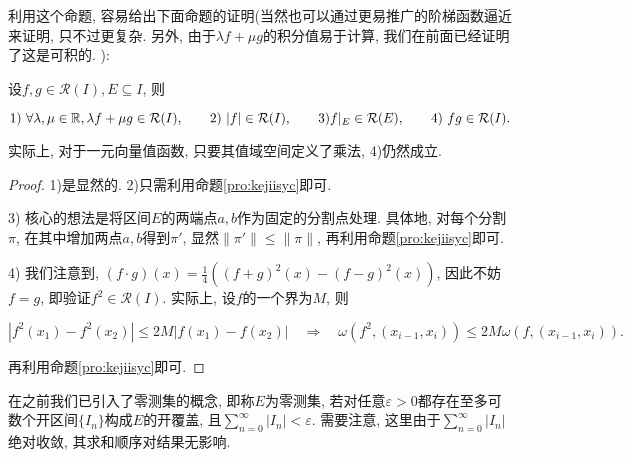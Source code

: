 利用这个命题, 容易给出下面命题的证明(当然也可以通过更易推广的阶梯函数逼近来证明, 只不过更复杂. 另外, 由于$\lambda f+ \mu g$的积分值易于计算, 我们在前面已经证明了这是可积的. ): 

\begin{proposition}{} \label{pro:jiffxkvi}
	设$f,g \in \mathcal{R}(I), E \subseteq I$, 则
	\begin{center}
		$1)~\forall \lambda ,\mu \in \mathbb{R} ,\lambda f+\mu g \in \mathcal{R}(I),\qquad 2)~|f| \in \mathcal{R}(I),\qquad 3) f|_E \in \mathcal{R}(E),\qquad 4)~fg \in \mathcal{R}(I).$
	\end{center}
\end{proposition}
\begin{remark}
	实际上, 对于一元向量值函数, 只要其值域空间定义了乘法, 4)仍然成立. 
\end{remark}
\begin{proof}
	1)是显然的. 2)只需利用命题\ref{pro:kejiisyc}即可. 
	
	3) 核心的想法是将区间$E$的两端点$a,b$作为固定的分割点处理. 具体地, 对每个分割$\pi$, 在其中增加两点$a,b$得到$\pi '$, 显然$\| \pi ' \| \leq \| \pi \|$, 再利用命题\ref{pro:kejiisyc}即可. 
	
	4) 我们注意到, $(f \cdot g)(x) = \frac{1}{4}((f+g)^2(x)-(f-g)^2(x))$, 因此不妨$f=g$, 即验证$f^2 \in \mathcal{R}(I)$. 实际上, 设$f$的一个界为$M$, 则
	\begin{center}
		$|f^2(x_1)-f^2(x_2)| \leq 2M|f(x_1)-f(x_2)| \quad \Rightarrow \quad \omega (f^2,(x_{i-1},x_i)) \leq 2M\omega (f,(x_{i-1},x_i)).$
	\end{center}
	再利用命题\ref{pro:kejiisyc}即可. 
\end{proof}

在之前我们已引入了零测集的概念, 即称$E$为零测集, 若对任意$\varepsilon >0$都存在至多可数个开区间$\{ I_n \}$构成$E$的开覆盖, 且$\sum_{n=0}^{\infty} |I_n|<\varepsilon$. 需要注意, 这里由于$\sum_{n=0}^{\infty} |I_n|$绝对收敛, 其求和顺序对结果无影响. 

